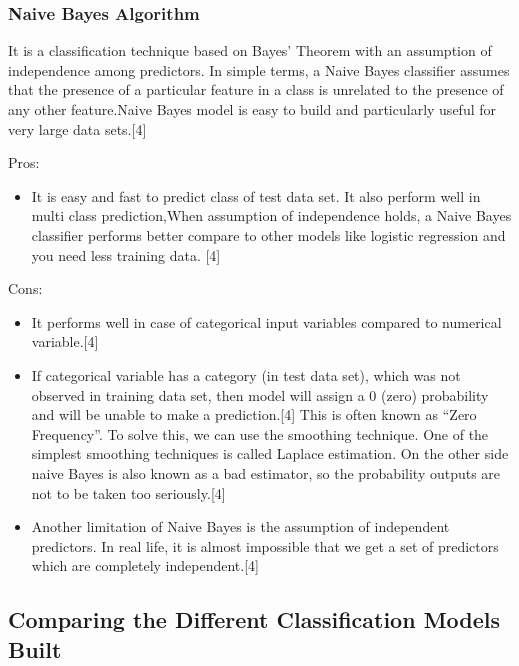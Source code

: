 \documentclass{article}
\begin{document}
\subsubsection {Naive Bayes Algorithm}

It is a classification technique based on Bayes’ Theorem with an assumption of independence among predictors. In simple terms, a Naive Bayes classifier assumes that the presence of a particular feature in a class is unrelated to the presence of any other feature.Naive Bayes model is easy to build and particularly useful for very large data sets.[4] \newline

Pros:
\begin{itemize}
\item It is easy and fast to predict class of test data set. It also perform well in multi class prediction,When assumption of independence holds, a Naive Bayes classifier performs better compare to other models like logistic regression and you need less training data. [4] \newline 
\end{itemize}

Cons:
\begin{itemize}
\item It performs well in case of categorical input variables compared to numerical variable.[4] \newline

\item If categorical variable has a category (in test data set), which was not observed in training data set, then model will assign a 0 (zero) probability and will be unable to make a prediction.[4] This is often known as “Zero Frequency”. To solve this, we can use the smoothing technique. One of the simplest smoothing techniques is called Laplace estimation.
On the other side naive Bayes is also known as a bad estimator, so the probability outputs are not to be taken too seriously.[4] \newline

\item Another limitation of Naive Bayes is the assumption of independent predictors. In real life, it is almost impossible that we get a set of predictors which are completely independent.[4]

\end{itemize}



\subsection {Comparing the Different Classification Models Built}
\end{document}
